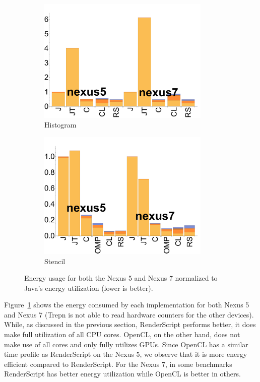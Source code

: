 \begin{figure}
  \begin{subfigure}[b]{0.23\textwidth}
      \centering
      \includegraphics[width=0.9\textwidth]{data/bbattery_histogram.pdf}
      \caption{Histogram}
  \end{subfigure}%
  \begin{subfigure}[b]{0.23\textwidth}
      \centering
      \includegraphics[width=0.9\textwidth]{data/bbattery_stencil.pdf}
      \caption{Stencil} 
  \end{subfigure}
  \caption{Energy usage for both the Nexus 5 and Nexus 7 normalized to Java's energy utilization (lower is better).}
  \label{fig:power}
\end{figure}

Figure~\ref{fig:power} shows the energy consumed by each implementation for both Nexus 5 and Nexus 7 
  (Trepn is not able to read hardware counters for the other devices).
While, as discussed in the previous section, RenderScript performs better, it does make full utilization of all CPU
  cores.
OpenCL, on the other hand, does not make use of all cores and only fully utilizes GPUs.
Since OpenCL has a similar time profile as RenderScript on the Nexus 5, we observe that it is more energy efficient
  compared to RenderScript.
For the Nexus 7, in some benchmarks RenderScript has better energy utilization while OpenCL is better in others.

